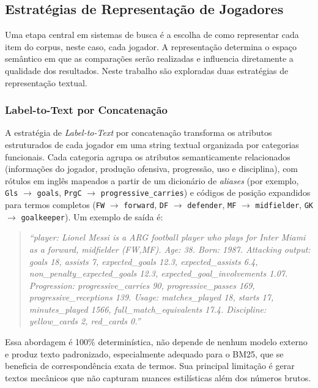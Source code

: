 \documentclass[portuguese]{sbc2025}
\begin{document}
\subsection{Estratégias de Representação de Jogadores}

Uma etapa central em sistemas de busca é a escolha de como representar cada item do
corpus, neste caso, cada jogador. A representação determina o espaço semântico em
que as comparações serão realizadas e influencia diretamente a qualidade dos resultados.
Neste trabalho são exploradas duas estratégias de representação textual.

\subsubsection{Label-to-Text por Concatenação}
\label{subsec:concat}

A estratégia de \textit{Label-to-Text} por concatenação transforma os atributos
estruturados de cada jogador em uma string textual organizada por categorias funcionais.
Cada categoria agrupa os atributos semanticamente relacionados (informações do jogador,
produção ofensiva, progressão, uso e disciplina), com rótulos em inglês mapeados a
partir de um dicionário de \textit{aliases} (por exemplo, \texttt{Gls}
$\rightarrow$ \texttt{goals}, \texttt{PrgC} $\rightarrow$ \texttt{progressive\_carries})
e códigos de posição expandidos para termos completos (\texttt{FW} $\rightarrow$
\texttt{forward}, \texttt{DF} $\rightarrow$ \texttt{defender}, \texttt{MF}
$\rightarrow$ \texttt{midfielder}, \texttt{GK} $\rightarrow$ \texttt{goalkeeper}).
Um exemplo de saída é:

\begin{quotation}
\textit{``player: Lionel Messi is a ARG football player who plays for Inter Miami as
a forward, midfielder (FW,MF). Age: 38. Born: 1987. Attacking output: goals 18,
assists 7, expected\_goals 12.3, expected\_assists 6.4,
non\_penalty\_expected\_goals 12.3, expected\_goal\_involvements 1.07.
Progression: progressive\_carries 90, progressive\_passes 169,
progressive\_receptions 139. Usage: matches\_played 18, starts 17,
minutes\_played 1566, full\_match\_equivalents 17.4.
Discipline: yellow\_cards 2, red\_cards 0.''}
\end{quotation}

Essa abordagem é 100\% determinística, não depende de nenhum modelo externo e produz
texto padronizado, especialmente adequado para o BM25, que se beneficia de correspondência
exata de termos. Sua principal limitação é gerar textos mecânicos que não capturam
nuances estilísticas além dos números brutos.
\end{document}
